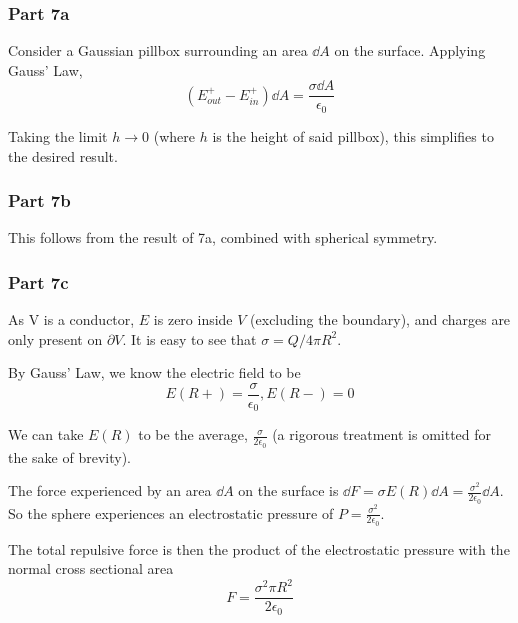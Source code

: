 \documentclass{article}
\begin{document}
\subsubsection{Part 7a}
Consider a Gaussian pillbox surrounding an area $\dd{A}$ on the surface. Applying Gauss' Law,
\[(E_{out}^+ - E_{in}^+) \dd{A} = \frac{\sigma \dd{A}}{\epsilon_0}\]

Taking the limit $h\rightarrow 0$ (where $h$ is the height of said pillbox), this simplifies to the desired result.
\subsubsection{Part 7b}
This follows from the result of 7a, combined with spherical symmetry.

\subsubsection{Part 7c} 
As V is a conductor, $E$ is zero inside $V$ (excluding the boundary), and charges are only present on $\partial V$. It is easy to see that $\sigma = Q/4\pi R^2$.

By Gauss' Law, we know the electric field to be
\[E(R+) = \frac{\sigma}{\epsilon_0}, E(R-) = 0\]

We can take $E(R)$ to be the average, $\frac{\sigma}{2\epsilon_0}$ (a rigorous treatment is omitted for the sake of brevity).

The force experienced by an area $\dd{A}$ on the surface is
$\dd{F} = \sigma E(R) \dd{A} = \frac{\sigma^2}{2\epsilon_0} \dd{A}$. So the sphere experiences an electrostatic pressure of $P=\frac{\sigma^2}{2\epsilon_0}$.

The total repulsive force is then the product of the electrostatic pressure with the normal cross sectional area \[F = \frac{\sigma^2 \pi R^2}{2\epsilon_0}\]
\end{document}
